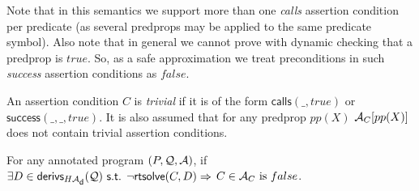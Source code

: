 \documentclass{llncs}
\newcommand{\Q}{\ensuremath{{\cal Q}}}
\newcommand{\A}
  {\ensuremath{{\cal A}}}
\newcommand{\AC}
  {\ensuremath{{\cal A}_{C}}}
\newcommand{\ACpp}[1]
  {\ensuremath{\AC[#1]}}
\newcommand{\derivationsHAd}[1]
  {\ensuremath{\textsf{derivs}_{H\A_{\textsf{\scriptsize{d}}}}(#1)}}
\newcommand{\callsAsr}[2]{\ensuremath{\textsf{calls}(#1, #2)}}
\newcommand{\successAsr}[3]{\ensuremath{\textsf{success}(#1, #2, #3)}}
\begin{document}
Note that in this semantics we support more than one \emph{calls}
assertion condition per predicate (as several predprops may be applied
to the same predicate symbol).
Also note that in general we cannot prove with dynamic checking that
a predprop is $true$. So, as a safe approximation we treat
preconditions in such \emph{success} assertion conditions as
$false$.

\begin{definition}
  An assertion condition $C$ is \emph{trivial} if it is of the form
  $\callsAsr{\_}{true}$ or $\successAsr{\_}{\_}{true}$. It is also
  assumed that for any predprop $pp(X)$ $\ACpp{pp(X)}$ does not contain
  trivial assertion conditions.
\end{definition}

\begin{theorem}
  \label{thm:rtcheckHO}
  For any annotated program $(P,\Q,\A)$, if
  $\exists D \in \derivationsHAd{\Q} \textsf{ s.t. } 
    \neg\textsf{rtsolve}(C,D) \Rightarrow$ 
  $C \in \AC \textrm{ is } false$.
\end{theorem}
\end{document}
